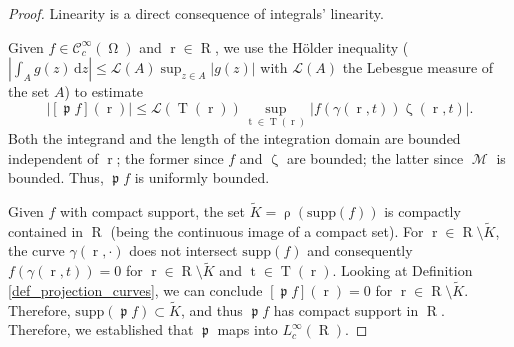 \documentclass[12pt]{article}
\DeclareMathOperator{\Projind}{\mathfrak{p}}
\newcommand{\dd}[1]{\,\mathrm{d}{#1}}
\newcommand{\supp}[1]{\mathrm{supp}\left(#1\right)}
\DeclareMathOperator{\tvariable}{t}
\DeclareMathOperator{\tgroundset}{T}
\DeclareMathOperator{\rayvariable}{r}
\DeclareMathOperator{\raygroundset}{R}
\DeclareMathOperator{\rayinverse}{\rho}
\DeclareMathOperator{\weightfkt}{\zeta}
\DeclareMathOperator{\imgdom}{{\Omega}}
\DeclareMathOperator{\gammagroundset}{{\mathcal M}}
\begin{document}
\begin{proof}
Linearity is a direct consequence of integrals' linearity. 

Given $f\in \mathcal{C}^\infty_c(\imgdom)$ and $\rayvariable\in \raygroundset$, we use the Hölder inequality ($|\int_A g (z)\dd z| \leq \mathcal{L}(A) \sup_{z\in A} |g(z)|$ with $\mathcal{L}(A)$ the Lebesgue measure of the set $A$) to  estimate
\begin{equation}
|[\Projind f] (\rayvariable)| \leq \mathcal{L}(\tgroundset(\rayvariable)) \sup_{\tvariable \in \tgroundset(\rayvariable)} |f(\gamma(\rayvariable,t)) \weightfkt(\rayvariable,t)|.
\end{equation}
Both the integrand and the length of the integration domain are bounded independent of $\rayvariable$; the former since $f$ and $\weightfkt$ are bounded; the latter since $\gammagroundset$ is bounded. 
Thus, $\Projind f$ is uniformly bounded. %

 Given $f$ with compact support, the set $\widetilde K = \rayinverse(\supp{f})$ is  compactly contained in $\raygroundset$ (being the continuous image of a compact set). For $\rayvariable \in \raygroundset \setminus \widetilde K$, the curve $\gamma(\rayvariable,\cdot)$ does not intersect $\supp{f}$ and consequently $f(\gamma(\rayvariable,t))=0$ for $\rayvariable \in \raygroundset \setminus \widetilde K$ and $\tvariable \in \tgroundset(\rayvariable)$. Looking at Definition \ref{def_projection_curves}, we can conclude $[\Projind f](\rayvariable)=0$ for $\rayvariable\in \raygroundset \setminus \widetilde K$. Therefore, $\supp{\Projind f}\subset \widetilde K$, and thus $\Projind f$ has compact support in $\raygroundset$. Therefore, we established that $\Projind$ maps into $L^\infty_c(\raygroundset)$.


\end{proof}
\end{document}
